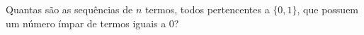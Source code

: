 \item Quantas são as sequências de $n$ termos, todos pertencentes a $\{0,1\}$, que possuem  um
  número ímpar de termos iguais a $0$?


